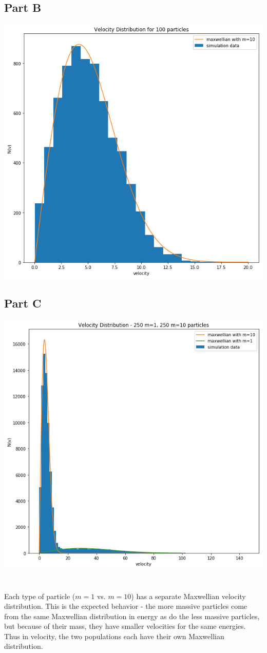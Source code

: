 \documentclass[a4paper, 11pt]{article}
\begin{document}
	\subsection*{Part B}
		\includegraphics[width=15cm]{maxwellian.png}
	\subsection*{Part C}
		\includegraphics[width=15cm]{two_maxwellian.png}
		\ \\ \\
		Each type of particle ($m=1$ vs. $m=10$) has a separate Maxwellian velocity distribution. This is the expected 
		behavior - the more massive particles come from the same Maxwellian distribution in energy as do the less massive 
		particles, but because of their mass, they have smaller velocities for the same energies. Thus in velocity, the two 
		populations each have their own Maxwellian distribution. 
\end{document}
